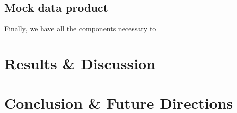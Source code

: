 \documentclass[12pt, onecolumn]{emulateapj}
\newcommand{\textul}{\underline}
\begin{document}
%
%
%

\subsection{Mock data product}
\label{sec:finalmockdata}

Finally, we have all the components necessary to 

\section{Results \& Discussion}
\label{sec:results}

\section{Conclusion \& Future Directions}
\label{sec:conclusion}


\end{document}

